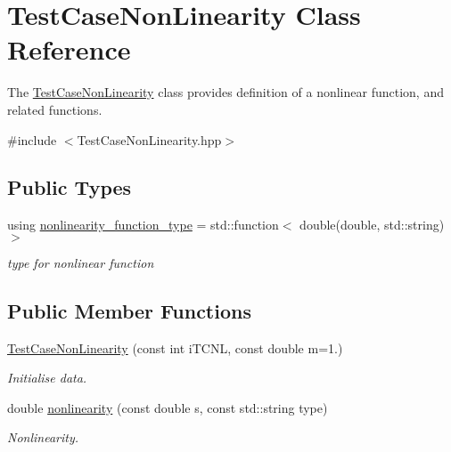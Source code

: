 \hypertarget{classTestCaseNonLinearity}{}\section{Test\+Case\+Non\+Linearity Class Reference}
\label{classTestCaseNonLinearity}


The \hyperlink{classTestCaseNonLinearity}{Test\+Case\+Non\+Linearity} class provides definition of a nonlinear function, and related functions.  




{\ttfamily \#include $<$Test\+Case\+Non\+Linearity.\+hpp$>$}

\subsection*{Public Types}
\begin{DoxyCompactItemize}
\item 
\mbox{\label{classTestCaseNonLinearity_a3d8a5c89c517dd0d9c835b7441ee9b07}} 
using \hyperlink{classTestCaseNonLinearity_a3d8a5c89c517dd0d9c835b7441ee9b07}{nonlinearity\+\_\+function\+\_\+type} = std\+::function$<$ double(double, std\+::string)$>$
\begin{DoxyCompactList}\small\item\em type for nonlinear function \end{DoxyCompactList}\end{DoxyCompactItemize}
\subsection*{Public Member Functions}
\begin{DoxyCompactItemize}
\item 
\hyperlink{classTestCaseNonLinearity_a490a6f0868a2edd9ecd6a88aaaca1ddb}{Test\+Case\+Non\+Linearity} (const int i\+T\+C\+NL, const double m=1.)
\begin{DoxyCompactList}\small\item\em Initialise data. \end{DoxyCompactList}\item 
double \hyperlink{classTestCaseNonLinearity_a62249600985bb7532fe498680b38f38a}{nonlinearity} (const double s, const std\+::string type)
\begin{DoxyCompactList}\small\item\em Nonlinearity. \end{DoxyCompactList}\end{DoxyCompactItemize}


